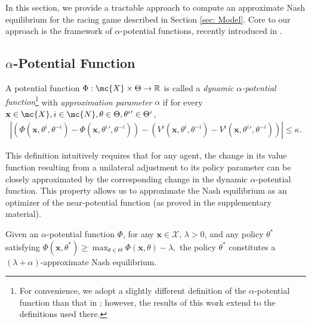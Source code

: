 In this section, we provide a tractable approach to compute an approximate Nash equilibrium for the racing game described in Section \ref{sec: Model}. Core to our approach is the framework of \(\alpha\)-potential functions, recently introduced in \citep{guo2023markov,maheshwari2024decentralized, guo2024alpha}. 

\subsection{\(\alpha\)-Potential Function}

\begin{definition}\label{def: NearPotentialFunction}
    A potential function \(\Phi: \mc{X}\times \Theta \rightarrow \mathbb{R}\) is called a \emph{dynamic \(\alpha\)-potential function}\footnote{For convenience, we adopt a slightly different definition of the \(\alpha\)-potential function than that in \cite{guo2023markov, maheshwari2024decentralized}; however, the results of this work extend to the definitions used there.} with \emph{approximation parameter} \(\alpha\) if for every \(\mathbf{x}\in \mc{X}, i\in \mc{N}, \theta\in \Theta, \theta^{i}{}'\in \Theta^i\),  
    \begin{align}\label{eq: NearMPGDef}
        |(\Phi(\mathbf{x}, \theta^i, \theta^{-i})-\Phi(\mathbf{x}, \theta^i{}', \theta^{-i}) ) - (V^i(\mathbf{x}, \theta^i, \theta^{-i})-V^i(\mathbf{x}, \theta^i{}', \theta^{-i}) )| \leq \kappa.  
    \end{align}
\end{definition}
This definition intuitively requires that for any agent, the change in its value function resulting from a unilateral adjustment to its policy parameter can be closely approximated by the corresponding change in the dynamic \(\alpha\)-potential function. This property allows us to approximate the Nash equilibrium as an optimizer of the near-potential function (as proved in the supplementary material). 

\vspace{-1mm}
\begin{proposition}\label{prop: NE_def_PotMax}
    Given an $\alpha$-potential function $\Phi$, for any $\mathbf{x} \in \mathcal{X}$, $\lambda > 0$, and any policy $\theta^\ast$ satisfying
\(
\Phi(\mathbf{x}, \theta^\ast) \geq \max_{\theta \in \Theta} \Phi(\mathbf{x}, \theta) - \lambda,\)
the policy $\theta^\ast$ constitutes a $(\lambda + \alpha)$-approximate Nash equilibrium.
\end{proposition}

